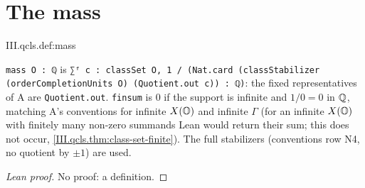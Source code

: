 \section{The mass}\label{sec:qcls-mass}

\begin{definition}[mass]
\end{definition}
\begin{tfformal}{III.qcls.def:mass}
\begin{tffidelity}
\texttt{mass O : ℚ} is \texttt{∑ᶠ c : classSet O, 1 / (Nat.card (classStabilizer (orderCompletionUnits O) (Quotient.out c)) : ℚ)}: the fixed representatives of A are \texttt{Quotient.out}. \texttt{finsum} is $0$ if the support is infinite and $1/0=0$ in $\mathbb{Q}$, matching A's conventions for infinite $X(\mathbb{O})$ and infinite $\Gamma$ (for an infinite $X(\mathbb{O})$ with finitely many non-zero summands Lean would return their sum; this does not occur, \cref{III.qcls.thm:class-set-finite}). The full stabilizers (conventions row N4, no quotient by $\pm1$) are used.
\end{tffidelity}
\end{tfformal}
\begin{proof}[Lean proof]
No proof: a definition.
\end{proof}


